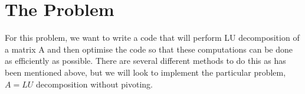\section{The Problem}
For this problem, we want to write a code that will perform LU decomposition of a matrix A and then optimise the code so that these computations can be done as efficiently as possible. There are several different methods to do this as has been mentioned above, but we will look to implement the particular problem, $A = LU$ decomposition without pivoting.
